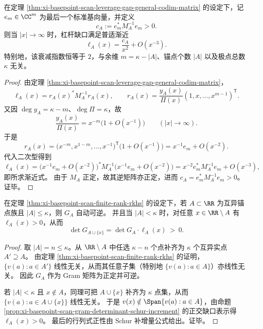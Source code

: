 \begin{theorem}\label{thm:xi-basepoint-scan-leverage-gap-universal-xminus2-tail}
在定理 \ref{thm:xi-basepoint-scan-leverage-gap-general-codim-matrix} 的设定下，记 \(e_m\in\CC^m\) 为最后一个标准基向量，并定义
\[
c_A:=e_m^\ast M_A^{-1}e_m>0.
\]
则当 \(|x|\to\infty\) 时，杠杆缺口满足普适渐近
\[
\boxed{\;
\ell_A(x)=\frac{c_A}{x^2}+O(x^{-3}).\;}
\]
特别地，该衰减指数恒等于 \(2\)，与余维 \(m=\kappa-|A|\)、锚点个数 \(|A|\) 以及极点总数 \(\kappa\) 无关。
\end{theorem}
\begin{proof}
由定理 \ref{thm:xi-basepoint-scan-leverage-gap-general-codim-matrix}，
\[
\ell_A(x)=r_A(x)^\ast M_A^{-1}r_A(x),
\qquad
r_A(x)=\frac{y_A(x)}{\Pi(x)}(1,x,\dots,x^{m-1})^{\mathsf T}.
\]
又因 \(\deg y_A=\kappa-m\)、\(\deg\Pi=\kappa\)，故
\[
\frac{y_A(x)}{\Pi(x)}=x^{-m}\bigl(1+O(x^{-1})\bigr)
\qquad(|x|\to\infty).
\]
于是
\[
r_A(x)
=
\bigl(x^{-m},x^{1-m},\dots,x^{-1}\bigr)^{\mathsf T}\bigl(1+O(x^{-1})\bigr)
=
x^{-1}e_m+O(x^{-2}).
\]
代入二次型得到
\[
\ell_A(x)
=
\bigl(x^{-1}e_m+O(x^{-2})\bigr)^\ast
M_A^{-1}
\bigl(x^{-1}e_m+O(x^{-2})\bigr)
=
x^{-2}e_m^\ast M_A^{-1}e_m+O(x^{-3}),
\]
即所求渐近式。
由于 \(M_A\) 正定，故其逆矩阵亦正定，进而 \(c_A=e_m^\ast M_A^{-1}e_m>0\)。
证毕。
\end{proof}

\begin{corollary}\label{cor:xi-basepoint-scan-gram-nondegeneracy-up-to-kappa}
在定理 \ref{thm:xi-basepoint-scan-finite-rank-rkhs} 的设定下，若 \(A\subset\RR\) 为互异锚点族且 \(|A|\le\kappa\)，则 \(G_A\) 自动可逆。
并且当 \(|A|<\kappa\) 时，对任意 \(x\in\RR\setminus A\) 有 \(\ell_A(x)>0\)，从而
\[
\det G_{A\cup\{x\}}=\det G_A\cdot \ell_A(x)\ >\ 0.
\]
\end{corollary}
\begin{proof}
取 \(|A|=n\le\kappa\)。从 \(\RR\setminus A\) 中任选 \(\kappa-n\) 个点补齐为 \(\kappa\) 个互异实点 \(A'\supseteq A\)。
由定理 \ref{thm:xi-basepoint-scan-finite-rank-rkhs} 的证明，\(\{v(a):a\in A'\}\) 线性无关，从而其任意子集（特别地 \(\{v(a):a\in A\}\)）亦线性无关。
因此 \(G_A\) 作为 Gram 矩阵为正定并可逆。
\par
若 \(|A|<\kappa\) 且 \(x\notin A\)，同理可把 \(A\cup\{x\}\) 补齐为 \(\kappa\) 点集，从而 \(\{v(a):a\in A\cup\{x\}\}\) 线性无关。
于是 \(v(x)\notin\Span\{v(a):a\in A\}\)，由命题 \ref{prop:xi-basepoint-scan-gram-determinant-schur-increment} 的正交缺口表示得 \(\ell_A(x)>0\)。
最后的行列式正性由 Schur 补增量公式给出。证毕。
\end{proof}


